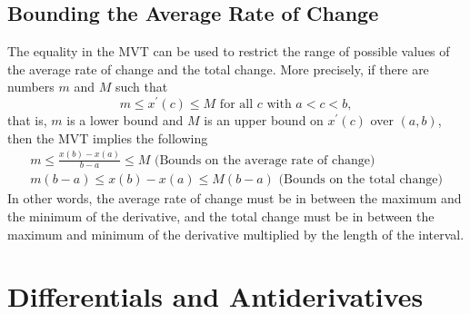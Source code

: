 \subsection{Bounding the Average Rate of Change}
The equality in the MVT can be used to restrict the range of possible values of the average rate of change and the total change. More precisely, if there are numbers $m$ and $M$ such that
\[m\le x^\prime(c)\le M\text{ for all $c$ with }a<c<b,\]
that is, $m$ is a lower bound and $M$ is an upper bound on $x^\prime(c)$ over $(a,b)$, then the MVT implies the following
\begin{gather*}
m\le\frac{x(b)-x(a)}{b-a}\le M\text{ (Bounds on the average rate of change)}\\
m(b-a)\le x(b)-x(a)\le M(b-a)\text{ (Bounds on the total change)}
\end{gather*}
In other words, the average rate of change must be in between the maximum and the minimum of the derivative, and the total change must be in between the maximum and minimum of the derivative multiplied by the length of the interval.
\section{Differentials and Antiderivatives}
